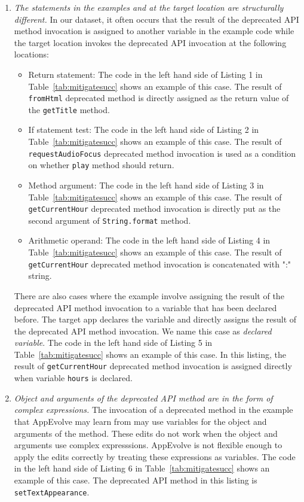 \begin{enumerate}
\item {\em The statements in the examples and at the target location are
 structurally different.} In our dataset, it often occurs that the result
 of the deprecated API method invocation is assigned to another variable in
 the example code while the target location invokes the deprecated API
 invocation at the following locations:
\begin{itemize}
\item Return statement: The code in the left hand side of Listing 1 in Table~\ref{tab:mitigatesucc} shows an example of this case. The result of {\tt fromHtml} deprecated method is directly assigned as the return value of the {\tt getTitle} method. 

\item If statement test:  The code in the left hand side of Listing 2 in Table~\ref{tab:mitigatesucc} shows an example of this case.  The result of {\tt requestAudioFocus} deprecated method invocation is used as a condition on whether {\tt play} method should return.

\item Method argument: The code in the left hand side of Listing 3 in Table~\ref{tab:mitigatesucc} shows an example of this case. The result of {\tt getCurrentHour} deprecated method invocation is directly put as the second argument of {\tt String.format} method.

\item Arithmetic operand: The code in the  left hand side of Listing 4 in Table~\ref{tab:mitigatesucc} shows an example of this case. The result of {\tt getCurrentHour} deprecated method invocation is concatenated with ":" string.
\end{itemize}

There are also cases where the example involve assigning the result of the deprecated API method invocation to a variable that has been declared before. The target app declares the variable and directly assigns the result of the deprecated API method invocation. We name this case as {\em declared variable}. 
The code in the left hand side of Listing 5 in Table~\ref{tab:mitigatesucc} shows an example of this case. In this listing, the result of {\tt getCurrentHour} deprecated method invocation is assigned directly when variable {\tt hours} is declared. 

\item {\em Object and arguments of the deprecated API method are in the form of complex expressions.} The invocation of a deprecated method in the example that AppEvolve may learn from may use variables for the object and arguments of the method. These edits do not work when the object and arguments use complex expresssions. AppEvolve is not flexible enough to apply the edits correctly by treating these expressions as variables. The code in the left hand side of Listing 6 in Table~\ref{tab:mitigatesucc} shows an example of this case. The deprecated API method in this listing is {\tt setTextAppearance}.


\end{enumerate}
